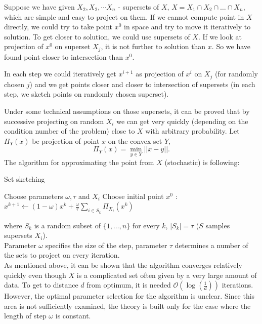 \documentclass[11pt]{book}
\begin{document}
Suppose we have given $X_2 , X_2 , \cdots X_n$ - supersets of $X$, $X=X_1 \cap X_2 \cap \dots \cap X_n$, which are simple and easy to project on them. If we cannot compute point in $X$ directly, we could try to take point $x^0$ in space and try to move it iteratively to solution. To get closer to solution, we could use supersets of $X$. If we look at projection of $x^0$ on superset $X_j$, it is not further to solution than $x$. So we have found point closer to intersection than $x^0$.

In each step we could iteratively get $x^{i+1}$ as projection of $x^i$ on $X_j$ (for randomly chosen $j$) and we get points closer and closer to intersection of supersets (in each step, we sketch points on randomly chosen superset).

Under some technical assumptions on those supersets, it can be proved that by successive projecting on random $X_i$ we can get very quickly (depending on the condition number of the problem) close to $X$ with arbitrary probability. Let $\Pi_Y(x)$ be projection of point $x$ on the convex set $Y$, $$\Pi_Y(x) = \min_{y \in Y} ||x-y||.$$ The algorithm for approximating the point from $X$ (stochastic) is following:

\begin{algorithm}[H]
	\caption{Set sketching \cite{projectionFeasibility,kaczmarz}}
	\label{alg:set sketch}
	\begin{algorithmic}[1]
		\State Choose parameters $\omega, \tau$ and $ X_i$
		\State Choose initial point $x^0$
		:
		\State $x^{k+1} \leftarrow (1 - \omega)x^k + \frac{\omega}{\tau}\sum_{i \in S_k} \Pi_{X_i}(x^k)$
		\EndFor
	\end{algorithmic}
\end{algorithm}

\noindent
where $S_k$ is a random subset of $\{ 1, \dots , n\}$ for every $k$, $|S_k|=\tau$ ($S$ samples supersets $X_i$).\\

Parameter $\omega$ specifies the size of the step, parameter $\tau$ determines a number of the sets to project on every iteration.\\

As mentioned above, it can be shown that the algorithm converges relatively quickly even though $X$ is a complicated set often given by a very large amount of data. To get to distance $d$ from optimum, it is needed $\mathcal{O} (\log(\frac{1}{d}))$ iterations\cite{sketchAndProject,kaczmarz}.  However, the optimal parameter selection for the algorithm is unclear. Since this area is not sufficiently examined, the theory is built only for the case where the length of step $\omega$ is constant.\\
\end{document}
